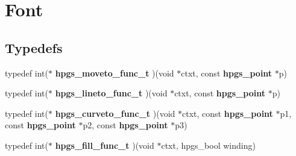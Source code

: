 \section{Font}
\label{group__font}
\subsection*{Typedefs}
\begin{CompactItemize}
\item 
typedef int($\ast$ \textbf{hpgs\_\-moveto\_\-func\_\-t} )(void $\ast$ctxt, const {\bf hpgs\_\-point} $\ast$p)\label{group__font_gdb482453b858b6b9561c76752f3e0e46}

\item 
typedef int($\ast$ \textbf{hpgs\_\-lineto\_\-func\_\-t} )(void $\ast$ctxt, const {\bf hpgs\_\-point} $\ast$p)\label{group__font_gaa432603ef5a4185c0e7d23e280a45b8}

\item 
typedef int($\ast$ \textbf{hpgs\_\-curveto\_\-func\_\-t} )(void $\ast$ctxt, const {\bf hpgs\_\-point} $\ast$p1, const {\bf hpgs\_\-point} $\ast$p2, const {\bf hpgs\_\-point} $\ast$p3)\label{group__font_g0b886c68898c98c2aaf7536f97d7bcc5}

\item 
typedef int($\ast$ \textbf{hpgs\_\-fill\_\-func\_\-t} )(void $\ast$ctxt, hpgs\_\-bool winding)\label{group__font_gbad7cbae9e3d41a823f63520ab61c167}

\end{CompactItemize}
